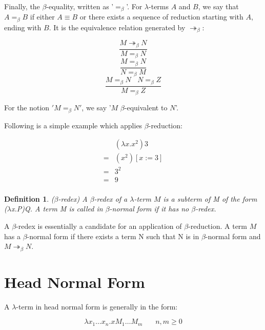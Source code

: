 \documentclass[a4paper,11pt,twoside]{report}
\newtheorem{def1}{\textbf{Definition}}[chapter]
\begin{document}
\noindent Finally, the $\beta$-equality, written as '$=_\beta$'. For $\lambda$-terms $A$ and $B$, we say that $A =_\beta B$ if either $A \equiv B$ or there exists a sequence of reduction starting with $A$, ending with $B$. It is the equivalence relation generated by $\twoheadrightarrow _\beta$:

\begin{equation*}
\frac{M\twoheadrightarrow _\beta N}{M = _\beta N}
\end{equation*}
\begin{equation*}
\frac{M = _\beta N}{N = _\beta M}
\end{equation*}
\begin{equation*}
\frac{M = _\beta N\ \ \ \ N = _\beta Z}{M = _\beta Z}
\end{equation*}

For the notion $'M = _\beta N'$, we say '$M$ $\beta$-equivalent to $N$'. 

\noindent Following is a simple example which applies $\beta$-reduction:

\begin{equation*}
\begin{array}{ll}
&(\lambda x.x^2)3\\
=& (x^2)[x:=3] \\
=& 3^2 \\
=&9 \\
\end{array}
\end{equation*}


\begin{def1}
($\beta$-redex) A $\beta$-redex of a $\lambda$-term $M$ is a subterm of M of the form ($\lambda$x.P)Q. A term M is called in $\beta$-normal form if it has no $\beta$-redex.
\end{def1}
A $\beta$-redex is essentially a candidate for an application of $\beta$-reduction. A term $M$ has a $\beta$-normal form if there exists a term N such that N is in $\beta$-normal form and $M \twoheadrightarrow _\beta N$. 

\section{Head Normal Form}

\noindent A $\lambda$-term in head normal form is generally in the form:

\begin{equation*}
\lambda x_1\ldots x_n.xM_1\ldots M_m\ \ \ \ \ \ \ \ n,m\geqslant 0
\end{equation*}
\end{document}
